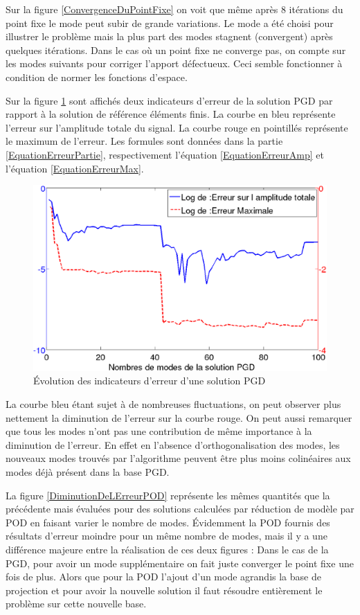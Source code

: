 \documentclass[12pt,a4paper]{report}
\begin{document}
Sur la figure \ref{ConvergenceDuPointFixe} on voit que même après $8$ itérations du point fixe le mode peut subir de grande variations. Le mode a été choisi pour illustrer le problème mais la plus part des modes stagnent (convergent) après quelques itérations. Dans le cas où un point fixe ne converge pas, on compte sur les modes suivants pour corriger l'apport défectueux. Ceci semble fonctionner à condition de normer les fonctions d'espace.

Sur la figure \ref{DiminutionDeLErreurPGD} sont affichés deux indicateurs d'erreur de la solution PGD par rapport à la solution de référence éléments finis. La courbe en bleu représente l'erreur sur l'amplitude totale du signal. La courbe rouge en pointillés représente le maximum de l'erreur. Les formules sont données dans la partie \ref{EquationErreurPartie}, respectivement l'équation \ref{EquationErreurAmp} et l'équation \ref{EquationErreurMax}.

\begin{figure}[!ht]
\centering
\includegraphics[width=0.7\linewidth]{Images/100ModesPGDAvecNormNonAmorti.eps}
\caption{Évolution des indicateurs d'erreur d'une solution PGD \label{DiminutionDeLErreurPGD}}
\end{figure}

La courbe bleu étant sujet à de nombreuses fluctuations, on peut observer plus nettement la diminution de l'erreur sur la courbe rouge. On peut aussi remarquer que tous les modes n'ont pas une contribution de même importance à la diminution de l'erreur. En effet en l'absence d'orthogonalisation des modes, les nouveaux modes trouvés par l'algorithme peuvent être plus moins colinéaires aux modes déjà présent dans la base PGD.

La figure \ref{DiminutionDeLErreurPOD} représente les mêmes quantités que la précédente mais évaluées pour des solutions calculées par réduction de modèle par POD en faisant varier le nombre de modes. Évidemment la POD fournis des résultats d'erreur moindre pour un même nombre de modes, mais il y a une différence majeure entre la réalisation de ces deux figures : Dans le cas de la PGD, pour avoir un mode supplémentaire on fait juste converger le point fixe une fois de plus. Alors que pour la POD l'ajout d'un mode agrandis la base de projection et pour avoir la nouvelle solution il faut résoudre entièrement le problème sur cette nouvelle base.
\end{document}
